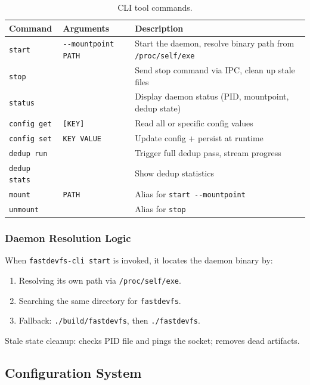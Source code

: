 \documentclass[12pt, a4paper]{article}
\begin{document}
\begin{table}[H]
\centering
\small
\begin{tabular}{llp{5cm}}
\toprule
\textbf{Command} & \textbf{Arguments} & \textbf{Description} \\
\midrule
\texttt{start} & \texttt{-{}-mountpoint PATH} & Start the daemon, resolve binary path from \texttt{/proc/self/exe} \\
\texttt{stop} & & Send stop command via IPC, clean up stale files \\
\texttt{status} & & Display daemon status (PID, mountpoint, dedup state) \\
\texttt{config get} & \texttt{[KEY]} & Read all or specific config values \\
\texttt{config set} & \texttt{KEY VALUE} & Update config + persist at runtime \\
\texttt{dedup run} & & Trigger full dedup pass, stream progress \\
\texttt{dedup stats} & & Show dedup statistics \\
\texttt{mount} & \texttt{PATH} & Alias for \texttt{start -{}-mountpoint} \\
\texttt{unmount} & & Alias for \texttt{stop} \\
\bottomrule
\end{tabular}
\caption{CLI tool commands.}
\end{table}

\subsubsection{Daemon Resolution Logic}

When \texttt{fastdevfs-cli start} is invoked, it locates the daemon binary by:
\begin{enumerate}
  \item Resolving its own path via \texttt{/proc/self/exe}.
  \item Searching the same directory for \texttt{fastdevfs}.
  \item Fallback: \texttt{./build/fastdevfs}, then \texttt{./fastdevfs}.
\end{enumerate}

Stale state cleanup: checks PID file and pings the socket; removes dead artifacts.

\subsection{Configuration System}
\end{document}
